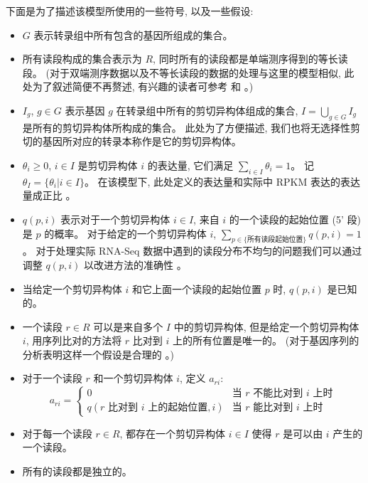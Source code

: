 下面是为了描述该模型所使用的一些符号, 以及一些假设: 
\begin{itemize}
\item $G$ 表示转录组中所有包含的基因所组成的集合。 

\item 所有读段构成的集合表示为 $R$, 同时所有的读段都是单端测序得到的等长读段。 
(对于双端测序数据以及不等长读段的数据的处理与这里的模型相似, 此处为了叙述简便不再赘述, 
有兴趣的读者可参考  和 。)

\item $I_g$, $g \in G$ 表示基因 $g$ 在转录组中所有的剪切异构体组成的集合, 
$I = \bigcup_{g \in G} I_g$ 是所有的剪切异构体所构成的集合。 
此处为了方便描述, 我们也将无选择性剪切的基因所对应的转录本称作是它的剪切异构体。 

\item $\theta_i \geq 0$, $i \in I$ 是剪切异构体 $i$ 的表达量, 
它们满足 $\sum_{i \in I} \theta_i = 1$。 记 $\theta_I = \{\theta_i | i \in I\}$。
在该模型下, 此处定义的表达量和实际中 RPKM 表达的表达量成正比 \cite{cufflinks.2010}。

\item $q(p, i)$ 表示对于一个剪切异构体 $i \in I$, 
来自 $i$ 的一个读段的起始位置 (5' 段) 是 $p$ 的概率。
对于给定的一个剪切异构体 $i$, 
$\sum_{p \in \{ \text{所有读段起始位置} \}} q(p, i) = 1$。
对于处理实际 RNA-Seq 数据中遇到的读段分布不均匀的问题我们可以通过调整 $q(p,i)$ 
以改进方法的准确性 \cite{roberts2011improving}。

\item 当给定一个剪切异构体 $i$ 和它上面一个读段的起始位置 $p$ 时, 
$q(p, i)$ 是已知的。

\item 一个读段 $r \in R$ 可以是来自多个 $I$ 中的剪切异构体, 
但是给定一个剪切异构体 $i$, 
用序列比对的方法将 $r$ 比对到 $i$ 上的所有位置是唯一的。 
(对于基因序列的分析表明这样一个假设是合理的 \cite{peng2011t}。) 

\item 对于一个读段 $r$ 和一个剪切异构体 $i$, 定义 $a_{ri}$: 
\[
a_{ri} = \begin{cases}
0 & \text{当 $r$ 不能比对到 $i$ 上时} \\
q(\text{$r$ 比对到 $i$ 上的起始位置},i) & \text{当 $r$ 能比对到 $i$ 上时} \end{cases}
\]

\item 对于每一个读段 $r \in R$, 
都存在一个剪切异构体 $i \in I$ 使得 $r$ 是可以由 $i$ 产生的一个读段。 

\item 所有的读段都是独立的。 
\end{itemize}

